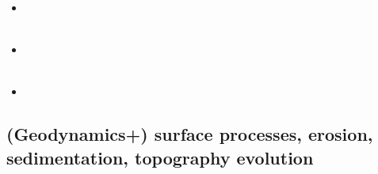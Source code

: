 \begin{scriptsize}
\begin{itemize}
\textcite{dusd18} \\
\textcite{mosp18} \\
\item[\twothousandnineteen] 
\textcite{pact19} \\
\textcite{halk19} \\
\item[\twothousandtwenty] 
\textcite{sams20} \\
\textcite{lahh20} \\
\item[\twothousandtwentytwo] 
\textcite{wecn22} \\
\end{itemize}
\end{scriptsize}

\subsection{(Geodynamics+) surface processes, erosion, sedimentation, topography evolution}

